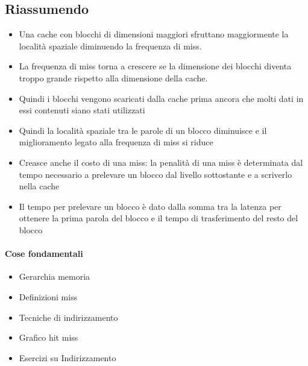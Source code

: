 \documentclass[12pt, a4paper, openany]{book}
\begin{document}
\subsection{Riassumendo}
\begin{itemize}
    \item Una cache con blocchi di dimensioni maggiori sfruttano maggiormente la località
    spaziale diminuendo la frequenza di miss.
    \item La frequenza di miss torna a crescere se la dimensione dei blocchi diventa troppo
    grande rispetto alla dimensione della cache.
    \item Quindi i blocchi vengono scaricati dalla cache prima ancora che molti dati
    in essi contenuti siano stati utilizzati
    \item Quindi la località spaziale tra le parole di un blocco diminuisce e il
    miglioramento legato alla frequenza di miss si riduce
    \item Creasce anche il costo di una miss: la penalità di una miss è determinata
    dal tempo necessario a prelevare un blocco dal livello sottostante e a scriverlo nella cache
    \item Il tempo per prelevare un blocco è dato dalla somma tra la latenza per ottenere
    la prima parola del blocco e il tempo di trasferimento del resto del blocco
\end{itemize}

\paragraph*{Cose fondamentali}
\begin{itemize}
    \item Gerarchia memoria
    \item Definizioni miss
    \item Tecniche di indirizzamento
    \item Grafico hit miss
    \item Esercizi su Indirizzamento
\end{itemize}
\end{document}
